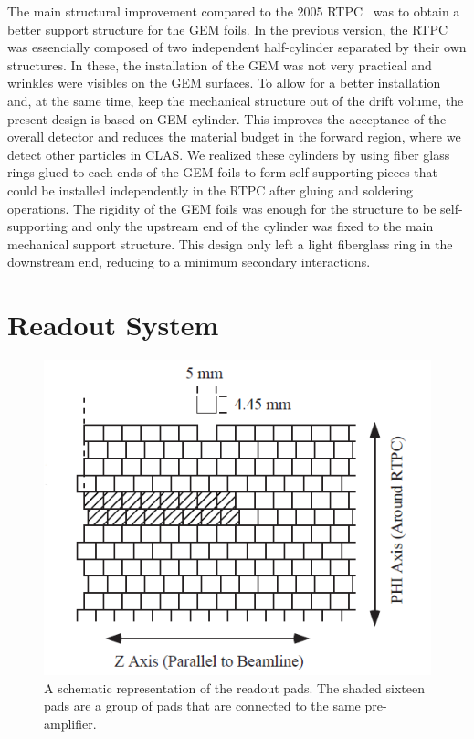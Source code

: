 \documentclass[preprint,5p]{elsarticle}
\begin{document}
The main structural improvement compared to the 2005 RTPC~\cite{Fenker:2008zz} 
was to obtain a better support structure for the GEM foils. In the previous version,
the RTPC was essencially composed of two independent half-cylinder separated
by their own structures. In these, the installation of the GEM was not very practical
and wrinkles were visibles on the GEM surfaces. To allow for a better installation 
and, at the same time, keep the mechanical structure out of the drift volume, 
the present design is based on GEM cylinder. This improves the acceptance of the
overall detector and reduces the material budget in the 
forward region, where we detect other particles in CLAS. We 
realized these cylinders by using fiber glass rings glued to 
each ends of the GEM foils to form self supporting pieces that could be 
installed independently in the RTPC after gluing and soldering operations. The 
rigidity of the GEM foils was enough for the structure to be self-supporting 
and only the upstream end of the cylinder was fixed to the main mechanical 
support structure. This design only left a light fiberglass ring in the 
downstream end, reducing to a minimum secondary interactions.

\section{Readout System} \label{sec_readout}

\begin{figure}[tb]
   \centering
   \includegraphics[scale=0.55]{PADs.png}
   \caption[]{A schematic representation of the readout pads. The 
   shaded sixteen pads are a group of pads that are connected to the same 
pre-amplifier.} \label{fig:PADs}
\end{figure}
\end{document}
